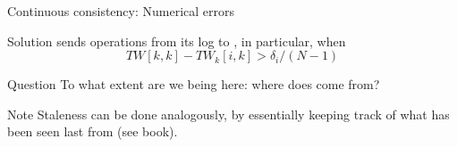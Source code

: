 \begin{slide}{Continuous consistency: Numerical errors}
  \begin{block}{Solution} 
     sends operations from its log to  , in particular, when \[TW[k,k] - TW_k[i,k] > \delta_i/(N-1)\]
  \end{block}
  \onslide
  \begin{block}{Question}
    To what extent are we being  here: where does  come from?
  \end{block}
  \onslide
  \begin{alertblock}{Note}
    Staleness can be done analogously, by essentially keeping track of what has been seen last from  (see
    book).
  \end{alertblock}
\end{slide}
